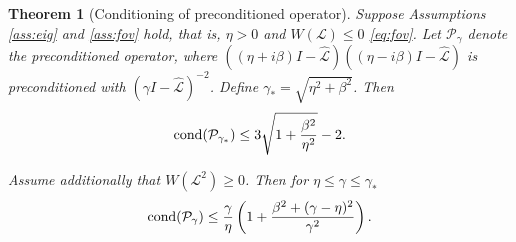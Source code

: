 \documentclass[a4paper,10pt]{article}
\newtheorem{theorem}{Theorem}
\begin{document}
%


\begin{theorem}[Conditioning of preconditioned operator]\label{th:cond}
Suppose Assumptions \ref{ass:eig} and \ref{ass:fov} hold, that is, $\eta > 0$
and $W(\mathcal{L}) \leq 0$ \eqref{eq:fov}. Let $\mathcal{P}_\gamma$ denote
the preconditioned operator, where $((\eta + i\beta)I -
\widehat{\mathcal{L}})((\eta - i\beta)I - \widehat{\mathcal{L}})$ is
preconditioned with $(\gamma I - \widehat{\mathcal{L}})^{-2}$.
Define $\gamma_* = \sqrt{\eta^2+\beta^2}$. Then
%
\begin{align}\label{eq:gammastar_}
\textnormal{cond}(\mathcal{P}_{\gamma_*}) \leq 
	3\sqrt{1+\frac{\beta^2}{\eta^2}} - 2.
\end{align}

Assume additionally that $W(\mathcal{L}^2) \geq 0$. Then for
$\eta \leq \gamma \leq \gamma_*$ 
\begin{align}\label{eq:cond_gen}
\textnormal{cond}(\mathcal{P}_\gamma) \leq \frac{\gamma}{\eta}
	\left(1 + \frac{\beta^2 + (\gamma-\eta)^2}{\gamma^2}\right).
\end{align}
\end{theorem}
\end{document}
